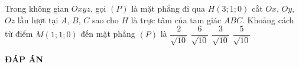 \begin{ex}%
Trong không gian $Oxyz$, gọi $\left(P\right)$ là mặt phẳng đi qua $H\left(3;1;0\right)$ cắt $Ox$, $Oy$, $Oz$ lần lượt tại $A$, $B$, $C$ sao cho $H$ là trực tâm của tam giác $ABC$. Khoảng cách từ điểm $M\left(1;1;0\right)$ đến mặt phẳng $\left(P\right)$ là 
\choice
{$\dfrac{2}{\sqrt{10}}$}
{\True $\dfrac{6}{\sqrt{10}}$}
{$\dfrac{3}{\sqrt{10}}$}
{$\dfrac{5}{\sqrt{10}}$}
\end{ex}







\newpage
\begin{center}
	\textbf{ĐÁP ÁN}
\end{center}
\begin{multicols}{10}
 
\end{multicols}

% 


